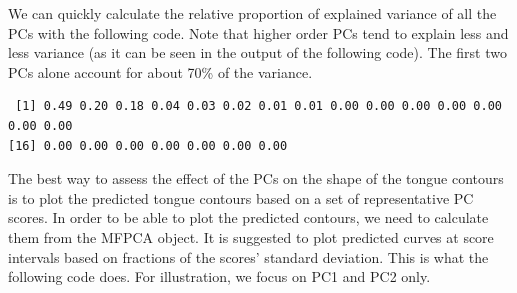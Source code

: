 \documentclass[
  man,
  longtable,
  nolmodern,
  notxfonts,
  notimes,
  colorlinks=true,linkcolor=blue,citecolor=blue,urlcolor=blue]{apa7}
\newenvironment{Shaded}{\begin{snugshade}}{\end{snugshade}}
\newcommand{\CommentTok}[1]{\textcolor[rgb]{0.37,0.37,0.37}{#1}}
\newcommand{\DecValTok}[1]{\textcolor[rgb]{0.68,0.00,0.00}{#1}}
\newcommand{\FunctionTok}[1]{\textcolor[rgb]{0.28,0.35,0.67}{#1}}
\newcommand{\NormalTok}[1]{\textcolor[rgb]{0.00,0.23,0.31}{#1}}
\newcommand{\SpecialCharTok}[1]{\textcolor[rgb]{0.37,0.37,0.37}{#1}}
\begin{document}
We can quickly calculate the relative proportion of explained variance
of all the PCs with the following code. Note that higher order PCs tend
to explain less and less variance (as it can be seen in the output of
the following code). The first two PCs alone account for about 70\% of
the variance.

\begin{Shaded}
\end{Shaded}

\begin{verbatim}
 [1] 0.49 0.20 0.18 0.04 0.03 0.02 0.01 0.01 0.00 0.00 0.00 0.00 0.00 0.00 0.00
[16] 0.00 0.00 0.00 0.00 0.00 0.00 0.00
\end{verbatim}

The best way to assess the effect of the PCs on the shape of the tongue
contours is to plot the predicted tongue contours based on a set of
representative PC scores. In order to be able to plot the predicted
contours, we need to calculate them from the MFPCA object. It is
suggested to plot predicted curves at score intervals based on fractions
of the scores' standard deviation. This is what the following code does.
For illustration, we focus on PC1 and PC2 only.
\end{document}
